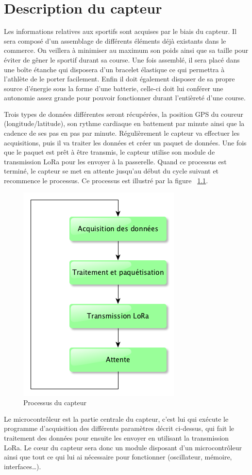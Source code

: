 \chapter{Description du capteur}

Les informations relatives aux sportifs sont acquises par le biais du capteur. Il sera composé d’un assemblage de différents éléments déjà existants dans le commerce. On veillera à minimiser au maximum son poids ainsi que sa taille pour éviter de gêner le sportif durant sa course. Une fois assemblé, il sera placé dans une boîte étanche qui disposera d’un bracelet élastique ce qui permettra à l’athlète de le porter facilement. Enfin il doit également disposer de sa propre source d’énergie sous la forme d’une batterie, celle-ci doit lui conférer une autonomie assez grande pour pouvoir fonctionner durant l’entièreté d’une course.

Trois types de données différentes seront récupérées, la position GPS du coureur (longitude/latitude), son rythme cardiaque en battement par minute ainsi que la cadence de ses pas en pas par minute. Régulièrement le capteur va effectuer les acquisitions, puis il va traiter les données et créer un paquet de données. Une fois que le paquet est prêt à être transmis, le capteur utilise son module de transmission LoRa pour les envoyer à la passerelle. Quand ce processus est terminé, le capteur se met en attente jusqu’au début du cycle suivant et recommence le processus. Ce processus est illustré par la figure ~\ref{fig:proc_capteur}.

\begin{figure}[htb]
\centering 
\includegraphics[width=0.4\columnwidth]{../images/capteur_flowchart.png} 
\caption[Processus Capteur]{Processus du capteur}
\label{fig:proc_capteur}
\end{figure}

Le microcontrôleur est la partie centrale du capteur, c’est lui qui exécute le programme d’acquisition des différents paramètres décrit ci-dessus, qui fait le traitement des données pour ensuite les envoyer en utilisant la transmission LoRa. Le cœur du capteur sera donc un module disposant d’un microcontrôleur ainsi que tout ce qui lui ai nécessaire pour fonctionner (oscillateur, mémoire, interfaces…).

